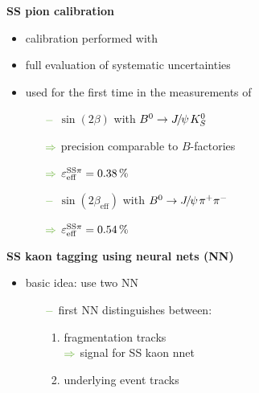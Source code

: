 {\begin{minipage}{0.474\boxwidth}
\textbf{SS pion calibration}
\vspace{-0.1em}
\begin{itemize}
\setlength\itemsep{0.01em}
\item calibration performed with \BdToJPsiKst
\item full evaluation of systematic uncertainties 
\item used for the first time in the measurements of
\begin{itemize}
\setlength{\itemindent}{-.11in}
\item[${\color{tu_gruen}-}$] $\sin(2\beta)$ with $\Bd \rightarrow \jpsi K_S^0$
\setlength{\itemindent}{.05in}
\item[${\color{tu_gruen}\Rightarrow}$] precision comparable to $B$-factories
\item[${\color{tu_gruen}\Rightarrow}$] $\varepsilon_{\text{eff}}^{\text{SS}\pi} = 0.38\,\%$
\setlength{\itemindent}{-.11in}
\item[${\color{tu_gruen}-}$] $\sin(2\beta_{\text{eff}})$ with $\Bd \rightarrow \jpsi \pi^+ \pi^-$
\setlength{\itemindent}{.05in}
\item[${\color{tu_gruen}\Rightarrow}$] $\varepsilon_{\text{eff}}^{\text{SS}\pi} = 0.54\,\%$
\end{itemize}

\end{itemize}
\end{minipage}
\vspace{0.3em}
\hfill
\begin{minipage}{0.474\boxwidth}
\vspace{-0.05em}
\textbf{SS kaon tagging using neural nets (NN)}
\vspace{-0.12em}

\begin{itemize}
\item basic idea: use two NN
	\begin{itemize}
	\setlength\itemsep{0.01em}
	\setlength{\itemindent}{-.11in}
	\item[${\color{tu_gruen}-}$] first NN distinguishes between:
		\begin{enumerate}
		\item fragmentation tracks\\
		${\color{tu_gruen}\Rightarrow}$ signal for SS kaon nnet
		\item underlying event tracks 
		\end{enumerate}
	\end{itemize}
\vspace{-1.7em}


\end{itemize}
\end{minipage}}

